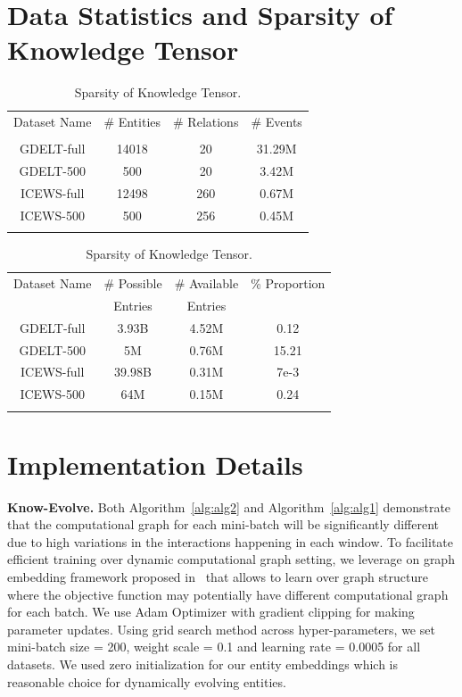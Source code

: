 \documentclass{article}
\begin{document}
\newpage
\vspace{-0.3cm}
\section{Data Statistics and Sparsity of Knowledge Tensor}
\label{sec:stats}

\begin{table}[h]
\parbox{.45\textwidth}{
\caption{Statistics for each dataset.}
\centering
\begin{tabular}{cccc}
\toprule
Dataset Name & \# Entities & \# Relations & \# Events\\
&&&\\
\midrule
GDELT-full & 14018 & 20 & 31.29M\\
GDELT-500 & 500 & 20 & 3.42M\\
ICEWS-full & 12498 & 260 & 0.67M\\
ICEWS-500 & 500 & 256 & 0.45M\\
\bottomrule
\label{tab:data_stat}
\end{tabular}
}
\quad\quad
\parbox{.45\textwidth}{
\caption{Sparsity of Knowledge Tensor.}
\centering
\begin{tabular}{cccc}
\toprule
Dataset Name & \# Possible & \# Available & \% Proportion\\
& Entries & Entries & \\
\midrule
GDELT-full & 3.93B & 4.52M & 0.12\\
GDELT-500 & 5M & 0.76M & 15.21\\
ICEWS-full & 39.98B & 0.31M & 7e-3\\
ICEWS-500 & 64M & 0.15M & 0.24\\
\bottomrule
\label{tab:spar_stat}
\end{tabular}
}
\vspace{-0.8cm}
\end{table}

\section{Implementation Details}
\label{sec:impl}
{\bf Know-Evolve.} Both Algorithm~\ref{alg:alg2} and Algorithm~\ref{alg:alg1}  demonstrate that the computational graph for each mini-batch will be significantly different due to high variations in the interactions happening in each window. To facilitate efficient training over dynamic computational graph setting, we leverage on graph embedding framework proposed in~\citep{DaiDaiSon16} that allows to learn over graph structure where the objective function may potentially have different computational graph for each batch. We use Adam Optimizer with gradient clipping for making parameter updates. Using grid search method across hyper-parameters, we set mini-batch size = 200, weight scale = 0.1 and learning rate = 0.0005 for all datasets. We used zero initialization for our entity embeddings which is reasonable choice for dynamically evolving entities. 
\end{document}
